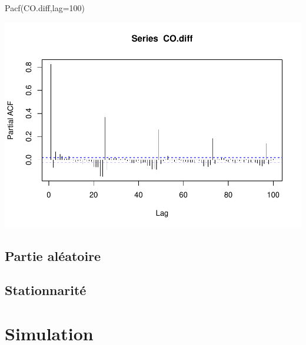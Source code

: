 \documentclass[
]{article}
\newenvironment{Shaded}{\begin{snugshade}}{\end{snugshade}}
\newcommand{\AttributeTok}[1]{\textcolor[rgb]{0.77,0.63,0.00}{#1}}
\newcommand{\CommentTok}[1]{\textcolor[rgb]{0.56,0.35,0.01}{\textit{#1}}}
\newcommand{\DecValTok}[1]{\textcolor[rgb]{0.00,0.00,0.81}{#1}}
\newcommand{\FunctionTok}[1]{\textcolor[rgb]{0.00,0.00,0.00}{#1}}
\newcommand{\NormalTok}[1]{#1}
\newcommand{\OtherTok}[1]{\textcolor[rgb]{0.56,0.35,0.01}{#1}}
\newcommand{\SpecialCharTok}[1]{\textcolor[rgb]{0.00,0.00,0.00}{#1}}
\begin{document}
\begin{Shaded}
\begin{Highlighting}[]
\FunctionTok{Pacf}\NormalTok{(CO.diff,}\AttributeTok{lag=}\DecValTok{100}\NormalTok{)}
\end{Highlighting}
\end{Shaded}

\includegraphics{STA202_report_files/figure-latex/unnamed-chunk-11-2.pdf}

\hypertarget{partie-aluxe9atoire}{%
\subsection{Partie aléatoire}\label{partie-aluxe9atoire}}

\hypertarget{stationnarituxe9}{%
\subsection{Stationnarité}\label{stationnarituxe9}}

\hypertarget{simulation}{%
\section{Simulation}\label{simulation}}

\begin{Shaded}
\end{Shaded}
\end{document}
